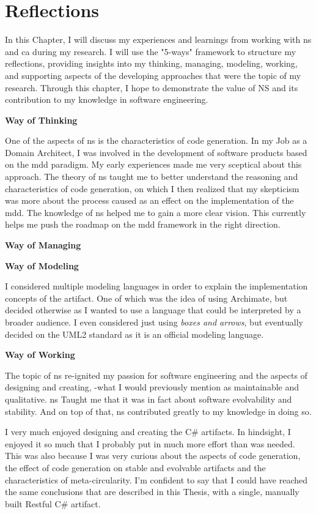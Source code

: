 \chapter{Reflections} \label{chap_reflection}

In this Chapter, I will discuss my experiences and learnings from working with \gls{ns}
and \gls{ca} during my research. I will use the "5-ways" framework to structure my
reflections, providing insights into my thinking, managing, modeling, working, and
supporting aspects of the developing approaches that were the topic of my research.
Through this chapter, I hope to demonstrate the value of NS and its contribution to my
knowledge in software engineering.

\textbf{Way of Thinking}

One of the aspects of \gls{ns} is the characteristics of code generation. In my Job as a
Domain Architect, I was involved in the development of software products based on the
\gls{mdd} paradigm. My early experiences made me very sceptical about this approach. The
theory of \gls{ns} taught me to better understand the reasoning and characteristics of
code generation, on which I then realized that my skepticism was more about the process
caused as an effect on the implementation of the \gls{mdd}. The knowledge of \gls{ns}
helped me to gain a more clear vision. This currently helps me push the roadmap on the
\gls{mdd} framework in the right direction.

\textbf{Way of Managing}


\textbf{Way of Modeling}

I considered multiple modeling languages in order to explain the implementation concepts
of the artifact. One of which was the idea of using Archimate, but decided otherwise as I
wanted to use a language that could be interpreted by a broader audience. I even
considered just using \emph{boxes and arrows}, but eventually decided on the UML2 standard
as it is an official modeling language.

\textbf{Way of Working}

The topic of \gls{ns} re-ignited my passion for software engineering and the aspects of
designing and creating, -what I would previously mention as maintainable and qualitative.
\gls{ns} Taught me that it was in fact about software evolvability and stability. And on
top of that, \gls{ns} contributed greatly to my knowledge in doing so.

I very much enjoyed designing and creating the C\# artifacts. In hindsight, I enjoyed it
so much that I probably put in much more effort than was needed. This was also because I
was very curious about the aspects of code generation, the effect of code generation on
stable and evolvable artifacts and the characteristics of meta-circularity. I'm confident
to say that I could have reached the same conclusions that are described in this Thesis,
with a single, manually built Restful C\# artifact.


